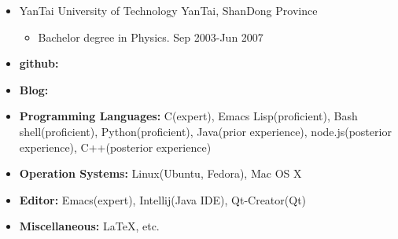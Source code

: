 \documentclass[a4paper, 10pt, titlepage]{article}
\begin{document}
\begin{itemize}

\item YanTai University of Technology \hfill \textrm{YanTai, ShanDong Province}
  \begin{itemize}
  \item Bachelor degree in Physics.  \hfill \textrm{Sep 2003-Jun 2007}
  \end{itemize}

\end{itemize}

\begin{itemize}
\item \textbf{github:}{\small \href{https://github.com/suzp1984}{\color{blue}{https://github.com/suzp1984}}}
\item \textbf{Blog:}{\small \href{http://zpcat.blogspot.com/}{\color{blue}{http://zpcat.blogspot.com/}}}
\item \textbf{Programming Languages:} C(expert), Emacs Lisp(proficient), Bash shell(proficient), Python(proficient), Java(prior experience), node.js(posterior experience), C++(posterior experience)
\item \textbf{Operation Systems:} Linux(Ubuntu, Fedora), Mac OS X
\item \textbf{Editor:} Emacs(expert), Intellij(Java IDE), Qt-Creator(Qt)
\item \textbf{Miscellaneous:} {\LaTeX}, etc.
\end{itemize}
\end{document}
